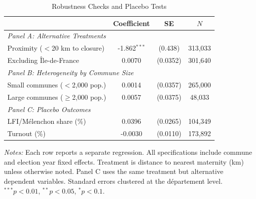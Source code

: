\begin{table}[htbp]
\centering
\caption{Robustness Checks and Placebo Tests}
\label{tab:robustness}
\begin{tabular}{lccc}
\toprule
 & Coefficient & SE & $N$ \\
\midrule
\multicolumn{4}{l}{\textit{Panel A: Alternative Treatments}} \\
Proximity ($<$20 km to closure) & -1.862$^{***}$ & (0.438) & 313,033 \\
Excluding \^{I}le-de-France & 0.0070 & (0.0352) & 301,640 \\
\midrule
\multicolumn{4}{l}{\textit{Panel B: Heterogeneity by Commune Size}} \\
Small communes ($<$2,000 pop.) & 0.0014 & (0.0357) & 265,000 \\
Large communes ($\geq$2,000 pop.) & 0.0057 & (0.0375) & 48,033 \\
\midrule
\multicolumn{4}{l}{\textit{Panel C: Placebo Outcomes}} \\
LFI/M\'{e}lenchon share (\%) & 0.0396 & (0.0265) & 104,349 \\
Turnout (\%) & -0.0030 & (0.0110) & 173,892 \\
\bottomrule
\end{tabular}
\begin{tablenotes}[flushleft]
\small
\item \textit{Notes:} Each row reports a separate regression. All specifications include commune and election year fixed effects. Treatment is distance to nearest maternity (km) unless otherwise noted. Panel C uses the same treatment but alternative dependent variables. Standard errors clustered at the d\'{e}partement level. $^{***}p<0.01$, $^{**}p<0.05$, $^{*}p<0.1$.
\end{tablenotes}
\end{table}

